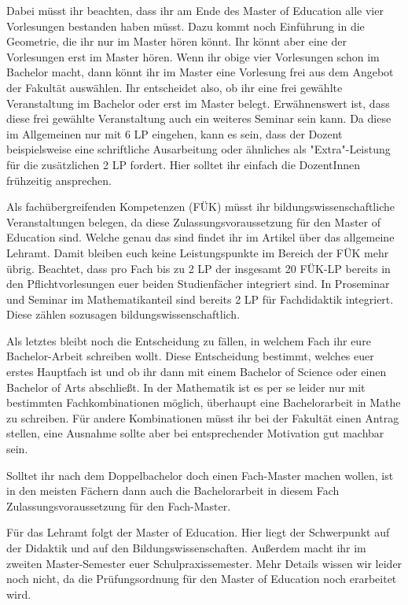 Dabei müsst ihr beachten, dass ihr am Ende des Master of Education alle vier
Vorlesungen bestanden haben müsst. Dazu kommt noch Einführung in die Geometrie,
die ihr nur im Master hören könnt. Ihr könnt aber eine der Vorlesungen erst im
Master hören. Wenn ihr obige vier Vorlesungen schon im Bachelor macht, dann
könnt ihr im Master eine Vorlesung frei aus dem Angebot der Fakultät auswählen.
Ihr entscheidet also, ob ihr eine frei gewählte Veranstaltung im Bachelor oder
erst im Master belegt.  Erwähnenswert ist, dass diese frei gewählte
Veranstaltung auch ein weiteres Seminar sein kann. Da diese im Allgemeinen nur
mit 6 LP eingehen, kann es sein, dass der Dozent beispielsweise eine
schriftliche Ausarbeitung oder ähnliches als "Extra"-Leistung für die
zusätzlichen 2 LP fordert. Hier solltet ihr einfach die DozentInnen frühzeitig
ansprechen.

Als fachübergreifenden Kompetenzen (FÜK) müsst ihr bildungswissenschaftliche
Veranstaltungen belegen, da diese Zulassungsvoraussetzung für den Master of
Education sind. Welche genau das sind findet ihr im Artikel über das allgemeine
Lehramt. Damit bleiben euch keine Leistungspunkte im Bereich der FÜK mehr übrig.
Beachtet, dass pro Fach bis zu 2 LP der insgesamt 20 FÜK-LP bereits in den
Pflichtvorlesungen euer beiden Studienfächer integriert sind. In Proseminar und
Seminar im Mathematikanteil sind bereits 2 LP für Fachdidaktik integriert.
Diese zählen sozusagen bildungswissenschaftlich.

Als letztes bleibt noch die Entscheidung zu fällen, in welchem Fach ihr eure
Bachelor-Arbeit schreiben wollt. Diese Entscheidung bestimmt, welches euer
erstes Hauptfach ist und ob ihr dann mit einem Bachelor of Science oder einen
Bachelor of Arts abschließt.
In der Mathematik ist es per se leider nur mit bestimmten Fachkombinationen
möglich, überhaupt eine Bachelorarbeit in Mathe zu schreiben.  Für andere
Kombinationen müsst ihr bei der Fakultät einen Antrag stellen, eine Ausnahme
sollte aber bei entsprechender Motivation gut machbar sein.

Solltet ihr nach dem Doppelbachelor doch einen Fach-Master machen wollen, ist in
den meisten Fächern dann auch die Bachelorarbeit in diesem Fach
Zulassungsvoraussetzung für den Fach-Master.

Für das Lehramt folgt der Master of Education. Hier liegt der Schwerpunkt auf
der Didaktik und auf den Bildungswissenschaften. Außerdem macht ihr im zweiten
Master-Semester euer Schulpraxissemester. Mehr Details wissen wir leider noch
nicht, da die Prüfungsordnung für den Master of Education noch erarbeitet wird.
